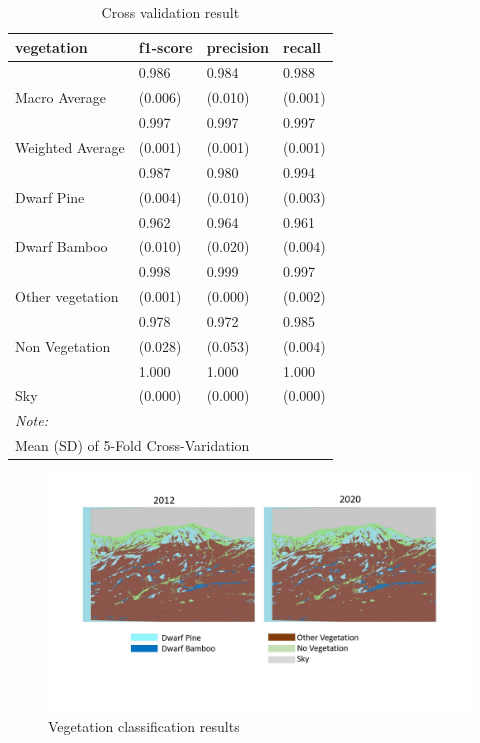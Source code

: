 \documentclass{article}
\begin{document}
\begin{table}

\caption{\label{tab:unnamed-chunk-1}Cross validation result \label{tab:vegetation_cv}}
\centering
\begin{tabular}[t]{llll}
\toprule
vegetation & f1-score & precision & recall\\
\midrule
 & 0.986 & 0.984 & 0.988\\
\cmidrule{2-4}
\multirow{-2}{*}{\raggedright\arraybackslash Macro Average} & (0.006) & (0.010) & (0.001)\\
\cmidrule{1-4}
 & 0.997 & 0.997 & 0.997\\
\cmidrule{2-4}
\multirow{-2}{*}{\raggedright\arraybackslash Weighted Average} & (0.001) & (0.001) & (0.001)\\
\cmidrule{1-4}
 & 0.987 & 0.980 & 0.994\\
\cmidrule{2-4}
\multirow{-2}{*}{\raggedright\arraybackslash Dwarf Pine} & (0.004) & (0.010) & (0.003)\\
\cmidrule{1-4}
 & 0.962 & 0.964 & 0.961\\
\cmidrule{2-4}
\multirow{-2}{*}{\raggedright\arraybackslash Dwarf Bamboo} & (0.010) & (0.020) & (0.004)\\
\cmidrule{1-4}
 & 0.998 & 0.999 & 0.997\\
\cmidrule{2-4}
\multirow{-2}{*}{\raggedright\arraybackslash Other vegetation} & (0.001) & (0.000) & (0.002)\\
\cmidrule{1-4}
 & 0.978 & 0.972 & 0.985\\
\cmidrule{2-4}
\multirow{-2}{*}{\raggedright\arraybackslash Non Vegetation} & (0.028) & (0.053) & (0.004)\\
\cmidrule{1-4}
 & 1.000 & 1.000 & 1.000\\
\cmidrule{2-4}
\multirow{-2}{*}{\raggedright\arraybackslash Sky} & (0.000) & (0.000) & (0.000)\\
\bottomrule
\multicolumn{4}{l}{\rule{0pt}{1em}\textit{Note: }}\\
\multicolumn{4}{l}{\rule{0pt}{1em}Mean (SD) of 5-Fold Cross-Varidation}\\
\end{tabular}
\end{table}

\begin{figure}
\includegraphics[width=1\linewidth]{vegetation} \caption{Vegetation classification results}\label{fig:vegetation}
\end{figure}
\end{document}
